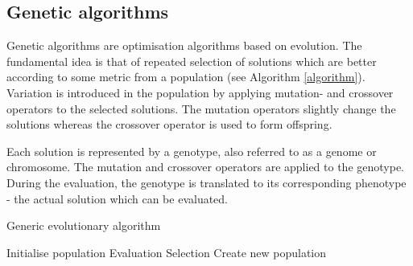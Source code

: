 \subsection{Genetic algorithms}

Genetic algorithms are optimisation algorithms based on evolution. The fundamental idea is that
of repeated selection of solutions which are better according to some metric from a population (see Algorithm \ref{algorithm}).
Variation is introduced in the population by applying mutation- and crossover operators to the
selected solutions. The mutation operators slightly change the solutions whereas the crossover
operator is used to form offspring.

Each solution is represented by a genotype, also referred to as a genome or chromosome.
The mutation and crossover operators are applied to the genotype. During the evaluation, the
genotype is translated to its corresponding phenotype - the actual solution which can be evaluated.


\begin{algorithm}[H]
    \caption{Generic evolutionary algorithm}
    \begin{algorithmic}

    \State Initialise population
        \State Evaluation 
        \State Selection  
        \State Create new population 
    \EndWhile
\EndProcedure

\end{algorithmic}
\label{algorithm}
\end{algorithm}
